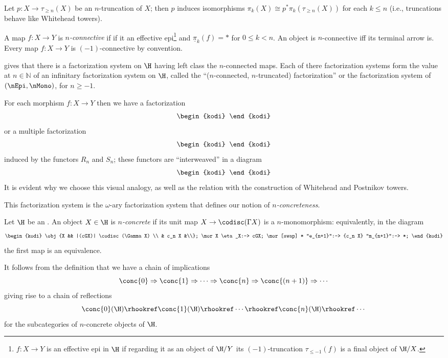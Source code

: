 \documentclass[12pt]{amsart}
\begin{document}
\begin{proposition}
Let $p : X \to \tau_{\ge n}(X)$ be an $n$-truncation of $X$; then $p$ induces isomorphisms $\pi_k(X) \cong p^* \pi_k(\tau_{\ge n}(X))$ for each $k \le n$ (i.e., truncations behave like Whitehead towers).
\end{proposition}
\begin{definition}
A map $f : X \to Y$ is \emph{$n$-connective} if if it an effective epi\footnote{$f : X \to Y$ is an effective epi in $\H$ if regarding it as an object of $\H/Y$ its $(-1)$-truncation $\tau_{\le -1}(f)$ is a final object of $\H/X$.} and $\underline{\pi}_k(f) = *$ for $0\le k < n$. An object is $n$-connective iff its terminal arrow is. Every map $f : X \to Y$ is $(-1)$-connective by convention.
\end{definition}
\begin{remark}
\cite[6.5.2.8]{HTT} gives that there is a factorization system on $\H$ having left class the $n$-connected maps. Each of there factorization systems form the value at $n\in\mathbb{N}$ of an infinitary factorization system on $\H$, called the ``($n$-connected, $n$-truncated) factorization'' or the factorization system of $(\nEpi, \nMono)$, for $n\ge -1$.
\end{remark}
For each morphism $f\colon X\to Y$ then we have a factorization
\[
\begin{kodi}
\end{kodi}
\]
or a multiple factorization
\[
\begin{kodi}
\end{kodi}
\]
induced by the functors $R_n$ and $S_n$; these functors are ``interweaved'' in a diagram
\[
\begin{kodi}
\end{kodi}
\]
It is evident why we choose this visual analogy, as well as the relation with the construction of Whitehead and Postnikov towers.

This factorization system is the $\omega$-ary factorization system that defines our notion of \emph{$n$-concreteness}.
\begin{definition}
Let $\H$ be an \inftop. An object $X\in\H$ is \emph{$n$-concrete} if its unit map $X \to \codisc(\Gamma X)$ is a $n$-monomorphism: equivalently, in the diagram
\[
\begin{kodi}
\obj{X && |(cGX)| \codisc(\Gamma X) \\
& c_n X &\\};
\mor X \eta_X:-> cGX;
\mor[swap] * "e_{n+1}":-> {c_n X} "m_{n+1}":-> *;
\end{kodi}
\]
the first map is an equivalence.
\end{definition}
It follows from the definition that we have a chain of implications
\[
\conc{0} \Rightarrow \conc{1} \Rightarrow \cdots \Rightarrow \conc{n}\Rightarrow \conc{(n+1)}\Rightarrow \cdots
\]
giving rise to a chain of reflections
\[
\conc{0}(\H) \rhookref \conc{1}(\H) \rhookref \cdots \rhookref \conc{n}(\H)\rhookref \cdots
\]
for the subcategories of $n$-concrete objects of $\H$.
\end{document}

